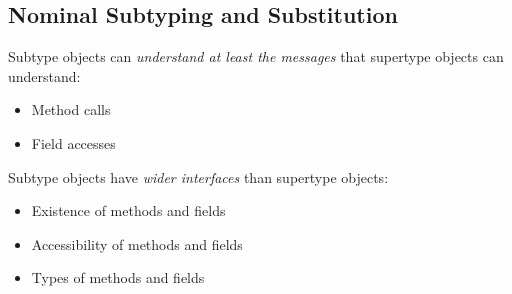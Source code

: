 \subsection{Nominal Subtyping and Substitution}
Subtype objects can \emph{understand at least the messages} that supertype objects can understand:
\begin{itemize}
 \item Method calls
 \item Field accesses
\end{itemize}
Subtype objects have \emph{wider interfaces} than supertype objects:
\begin{itemize}
 \item Existence of methods and fields
 \item Accessibility of methods and fields
 \item Types of methods and fields
\end{itemize}

